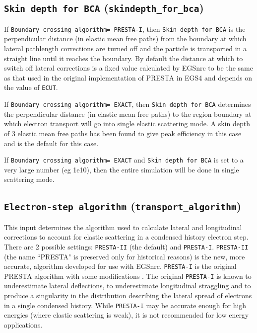 \documentclass[12pt,twoside]{article}      %
\begin{document}
\subsection{{\tt  Skin depth for BCA} ({\tt skindepth\_for\_bca})}
\label{skindepthsect}

If {\tt Boundary crossing algorithm= PRESTA-I}, then
{\tt Skin depth for BCA} is the perpendicular distance
(in elastic mean free paths) from the boundary
at which lateral pathlength corrections are turned off and the particle
is transported in a straight line until it reaches the boundary.
By default the distance at which to switch off
lateral corrections is a fixed value calculated by EGSnrc to be
the same as that used in the original implementation of PRESTA in EGS4 and
depends on the value of {\tt ECUT}.

If {\tt Boundary crossing algorithm= EXACT}, then {\tt  Skin depth for BCA}
determines the perpendicular distance (in elastic mean
free paths) to the region boundary
at which electron transport will go into
single elastic scattering mode.  A skin depth of 3 elastic mean free
paths has been found to give peak efficiency in this case and is the
default for this case.

If {\tt Boundary crossing algorithm= EXACT} and
{\tt  Skin depth for BCA} is set to a very large number (eg 1e10),
then the entire simulation will be done in single scattering mode.


\subsection{{\tt Electron-step algorithm} ({\tt transport\_algorithm})}
\label{essect}

This input determines the algorithm used to calculate lateral and
longitudinal corrections to account for elastic scattering in a condensed
history electron step.  There
are 2 possible settings: {\tt PRESTA-II} (the default) and
{\tt PRESTA-I}.  {\tt PRESTA-II} (the name ``PRESTA" is preserved only
for historical reasons) is the new, more accurate, algorithm developed for
use with EGSnrc\cite{KR00}.  {\tt PRESTA-I} is the original
PRESTA algorithm with some modifications
\cite{BR87,Le50}.  The original {\tt PRESTA-I} is
known to underestimate lateral deflections, to underestimate longitudinal
straggling and to produce a singularity in the distribution describing
the lateral spread of electrons in a single condensed history.
While {\tt PRESTA-I} may be accurate enough for high energies
(where elastic scattering is weak), it is not recommended for low
energy applications.
\end{document}

